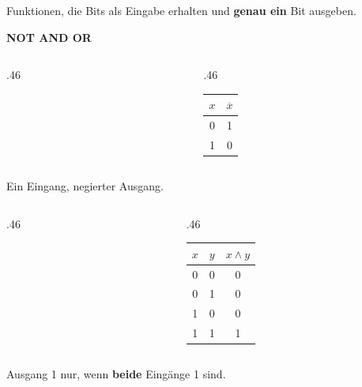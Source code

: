 \begin{frame}
\begin{center}
Funktionen, die Bits als Eingabe erhalten und \textbf{genau ein} Bit ausgeben.
\end{center}
\vspace{4mm}
\begin{center}
\Large\bfseries\color{FDUteal}NOT \quad AND \quad OR
\end{center}
\end{frame}

\begin{frame}
\begin{columns}[c,onlytextwidth]
\begin{column}{.46\textwidth}

\end{column}
\begin{column}{.46\textwidth}
\begin{tabular}{cc}
    $x$ & $\overline{x}$ \\\midrule
    0 & 1 \\
    1 & 0 \\
\end{tabular}
\end{column}
\end{columns}
\vspace{3mm}
\begin{center}Ein Eingang, negierter Ausgang.\end{center}
\end{frame}

\begin{frame}
\begin{columns}[c,onlytextwidth]
\begin{column}{.46\textwidth}

\end{column}
\begin{column}{.46\textwidth}
\begin{tabular}{ccc}
    $x$ & $y$ & $x \wedge y$ \\\midrule
    0 & 0 & 0 \\
    0 & 1 & 0 \\
    1 & 0 & 0 \\
    1 & 1 & 1 \\
\end{tabular}
\end{column}
\end{columns}
\vspace{3mm}
\begin{center}Ausgang 1 nur, wenn \textbf{beide} Eingänge 1 sind.\end{center}
\end{frame}

